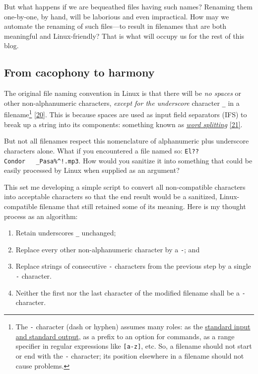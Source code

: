 \documentclass[
  a4paper,
]{article}
\providecommand{\tightlist}{%
  \setlength{\itemsep}{0pt}\setlength{\parskip}{0pt}}
\begin{document}
But what happens if we are bequeathed files having such names? Renaming
them one-by-one, by hand, will be laborious and even impractical. How
may we automate the renaming of such files---to result in filenames that
are both meaningful and Linux-friendly? That is what will occupy us for
the rest of this blog.

\hypertarget{from-cacophony-to-harmony}{%
\subsection{From cacophony to harmony}\label{from-cacophony-to-harmony}}

The original file naming convention in Linux is that there will be
\emph{no spaces} or other non-alphanumeric characters, \emph{except for
the underscore} character \texttt{\_} in a filename\footnote{The
  \texttt{-} character (dash or hyphen) assumes many roles: as the
  \href{https://en.wikipedia.org/wiki/Standard_streams}{standard input
  and standard output}, as a prefix to an option for commands, as a
  range specifier in regular expressions like \texttt{{[}a-z{]}}, etc.
  So, a filename should not start or end with the \texttt{-} character;
  its position elsewhere in a filename should not cause problems.}
\protect\hyperlink{ref-unix}{{[}20{]}}. This is because spaces are used
as input field separators (IFS) to break up a string into its
components: something known as
\href{https://mywiki.wooledge.org/WordSplitting?highlight=\%28spaces\%29\%7C\%28word\%29\%7C\%28splitting\%29}{\emph{word
splitting}} \protect\hyperlink{ref-wordsplitting}{{[}21{]}}.

But not all filenames respect this nomenclature of alphanumeric plus
underscore characters alone. What if you encountered a file named so:
\texttt{El??Condor\ \ \ \_Pasa\%\^{}!.mp3}. How would you sanitize it
into something that could be easily processed by Linux when supplied as
an argument?

This set me developing a simple script to convert all non-compatible
characters into acceptable characters so that the end result would be a
sanitized, Linux-compatible filename that still retained some of its
meaning. Here is my thought process as an algorithm:

\begin{enumerate}
\tightlist
\item
  Retain underscores \texttt{\_} unchanged;
\item
  Replace every other non-alphanumeric character by a \texttt{-}; and
\item
  Replace strings of consecutive \texttt{-} characters from the previous
  step by a single \texttt{-} character.
\item
  Neither the first nor the last character of the modified filename
  shall be a \texttt{-} character.
\end{enumerate}
\end{document}
